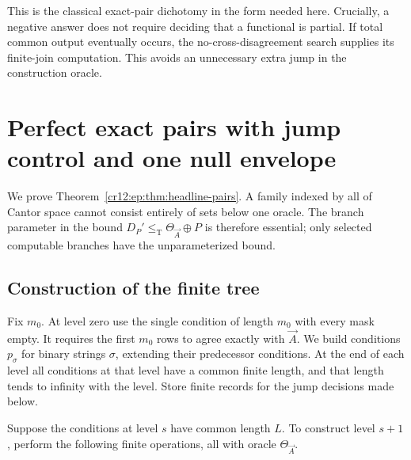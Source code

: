 \documentclass[11pt,letterpaper]{article}
\theoremstyle{plain}
\theoremstyle{definition}
\theoremstyle{remark}
\numberwithin{equation}{section}
\newcommand{\leT}{\leq_{\mathrm T}}
\begin{document}
This is the classical exact-pair dichotomy in the form needed here. Crucially, a
negative answer does not require deciding that a functional is partial. If total
common output eventually occurs, the no-cross-disagreement search supplies its
finite-join computation. This avoids an unnecessary extra jump in the construction
oracle.

\section{Perfect exact pairs with jump control and one null envelope}\label{cr12:ep:sec:fusion}
We prove Theorem~\ref{cr12:ep:thm:headline-pairs}. A family indexed by all of Cantor
space cannot consist entirely of sets below one oracle. The branch parameter in the
bound $D_P'\leT \Theta_{\vec A}\oplus P$ is therefore essential; only selected
computable branches have the unparameterized bound.

\subsection{Construction of the finite tree}
Fix $m_0$. At level zero use the single condition of length $m_0$ with every mask
empty. It requires the first $m_0$ rows to agree exactly with $\vec A$. We build
conditions $p_\sigma$ for binary strings $\sigma$, extending their predecessor
conditions. At the end of each level all conditions at that level have a common
finite length, and that length tends to infinity with the level. Store finite
records for the jump decisions made below.

Suppose the conditions at level $s$ have common length $L$. To construct level
$s+1$, perform the following finite operations, all with oracle $\Theta_{\vec A}$.
\end{document}
